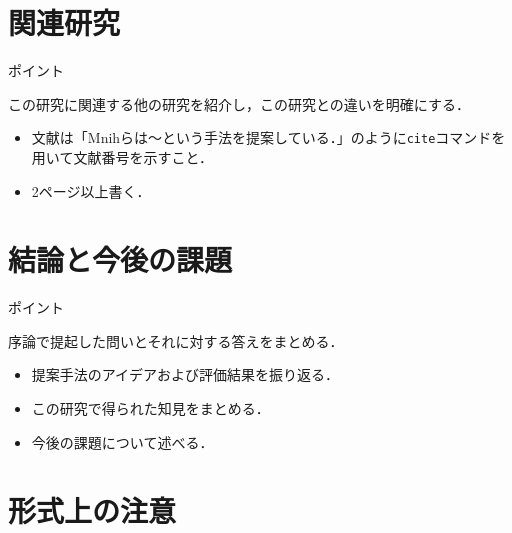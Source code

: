 \documentclass[a4j,11pt,report]{jsbook}
\newcommand{\point}[1]{
\begin{itembox}[l]{ポイント}
  #1
\end{itembox}
}
\begin{document}
\chapter{関連研究\label{ch:relatedwork}}
\point{
この研究に関連する他の研究を紹介し，この研究との違いを明確にする．
\begin{itemize}
  \item 文献は「Mnihらは～という手法を提案している\cite{Mnih15}．」のように\texttt{cite}コマンドを用いて文献番号を示すこと．
  \item 2ページ以上書く．
\end{itemize}
}

\chapter{結論と今後の課題 \label{ch:conclusion}}

\point{
序論で提起した問いとそれに対する答えをまとめる．
\begin{itemize}
  \item 提案手法のアイデアおよび評価結果を振り返る．
  \item この研究で得られた知見をまとめる．
  \item 今後の課題について述べる．
\end{itemize}
}




\appendix

\chapter{形式上の注意}
\end{document}
